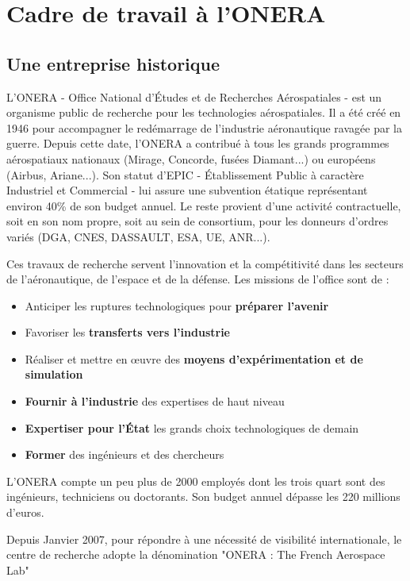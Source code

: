 

\section{Cadre de travail à l'ONERA}
\subsection{Une entreprise historique}
L'ONERA - Office National d'Études et de Recherches Aérospatiales - est un organisme public de recherche pour les technologies aérospatiales. Il a été créé en 1946 pour accompagner le redémarrage de l'industrie aéronautique ravagée par la guerre. Depuis cette date, l'ONERA a contribué à tous les grands programmes aérospatiaux nationaux (Mirage, Concorde, fusées Diamant...) ou européens (Airbus, Ariane...). Son statut d'EPIC - Établissement Public à caractère Industriel et Commercial - lui assure une subvention étatique représentant environ 40\% de son budget annuel. Le reste provient d'une activité contractuelle, soit en son nom propre, soit au sein de consortium, pour les donneurs d'ordres variés (DGA, CNES, DASSAULT, ESA, UE, ANR...).

Ces travaux de recherche servent l'innovation et la compétitivité dans les secteurs de l'aéronautique, de l'espace et de la défense. Les missions de l'office sont de : 
\begin{itemize}
	\item Anticiper les ruptures technologiques pour \textbf{préparer l'avenir}
	\item Favoriser les \textbf{transferts vers l'industrie}
	\item Réaliser et mettre en œuvre des \textbf{moyens d'expérimentation et de simulation}
	\item \textbf{Fournir à l'industrie} des expertises de haut niveau
	\item \textbf{Expertiser pour l'État} les grands choix technologiques de demain
	\item \textbf{Former} des ingénieurs et des chercheurs
\end{itemize}

L'ONERA compte un peu plus de 2000 employés dont les trois quart sont des ingénieurs, techniciens ou doctorants. Son budget annuel dépasse les 220 millions d'euros.

Depuis Janvier 2007, pour répondre à une nécessité de visibilité internationale, le centre de recherche adopte la dénomination "ONERA : The French Aerospace Lab"

